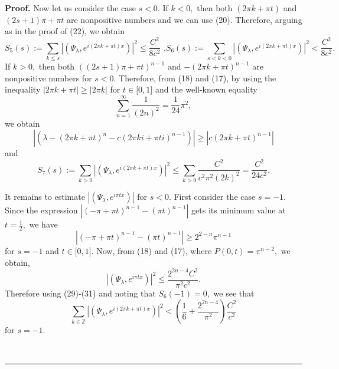 \documentclass[10pt,a4paper]{amsart}
\newenvironment{proof}[1][Proof]{\textbf{#1.} }{\ \rule{0.5em}{0.5em}}
\begin{document}
\begin{proof}
Now let us consider the case $s<0.$ If $k<0,$ then both $(2\pi k+\pi t)$ and
$(2s+1)\pi+\pi t$ are nonpositive numbers and we can use (20). Therefore,
arguing as in the proof of (22), we obtain
\begin{equation}
S_{5}(s):=\sum_{k\leq s}\left\vert \left(  \Psi_{\lambda},e^{i\left(  2\pi
k+\pi t\right)  x}\right)  \right\vert ^{2}\leq\frac{C^{2}}{8c^{2}}\text{ ,
}S_{6}(s):=\sum_{s<k<0}\left\vert \left(  \Psi_{\lambda},e^{i\left(  2\pi
k+\pi t\right)  x}\right)  \right\vert ^{2}<\frac{C^{2}}{8c^{2}}.\tag{29}%
\end{equation}
If $k>0,$ then both $((2s+1)\pi+\pi t)^{n-1}$ and $-(2\pi k+\pi t)^{n-1}$ are
nonpositive numbers for $s<0.$ Therefore, from (18) and (17), by using the
inequality $\left\vert 2\pi k+\pi t\right\vert \geq\left\vert 2\pi
k\right\vert $ for $t\in\lbrack0,1]$ and the well-known equality
\[
\sum_{n=1}^{\infty}\frac{1}{(2n)^{2}}=\frac{1}{24}\pi^{2},
\]
we obtain%
\[
\left\vert \left(  \lambda-\left(  2\pi k+\pi t\right)  ^{n}-c(2\pi ki+\pi
ti)^{n-1}\right)  \right\vert \geq\left\vert c(2\pi k+\pi t)^{n-1}\right\vert
\]
and
\begin{equation}
S_{7}(s):=\sum_{k>0}\left\vert \left(  \Psi_{\lambda},e^{i\left(  2\pi k+\pi
t\right)  x}\right)  \right\vert ^{2}\leq\sum_{k>0}\frac{C^{2}}{c^{2}\pi
^{2}(2k)^{2}}=\frac{C^{2}}{24c^{2}}.\tag{30}%
\end{equation}


It remains to estimate $\left\vert \left(  \Psi_{\lambda},e^{i\pi tx}\right)
\right\vert $ for $s<0.$ First consider the case $s=-1.$ Since the expression
$\left\vert (-\pi+\pi t)^{n-1}-(\pi t)^{n-1}\right\vert $ gets its minimum
value at $t=\frac{1}{2},$ we have
\[
\left\vert (-\pi+\pi t)^{n-1}-(\pi t)^{n-1}\right\vert \geq2^{2-n}\pi^{n-1}%
\]
for $s=-1$ and $t\in\lbrack0,1].$ Now, from (18) and (17), where
$P(0,t)=\pi^{n-2},$ we obtain, \
\begin{equation}
\left\vert \left(  \Psi_{\lambda},e^{i\pi tx}\right)  \right\vert ^{2}%
\leq\frac{2^{2n-4}C^{2}}{\pi^{2}c^{2}}. \tag{31}%
\end{equation}
Therefore using (29)-(31) and noting that $S_{6}(-1)=0,$ we see that
\begin{equation}
\sum_{k\in\mathbb{Z}}\left\vert \left(  \Psi_{\lambda},e^{i\left(  2\pi k+\pi
t\right)  x}\right)  \right\vert ^{2}<\left(  \frac{1}{6}+\frac{2^{2n-4}}%
{\pi^{2}}\right)  \frac{C^{2}}{c^{2}} \tag{32}%
\end{equation}
for $s=-1.$


\end{proof}
\end{document}
